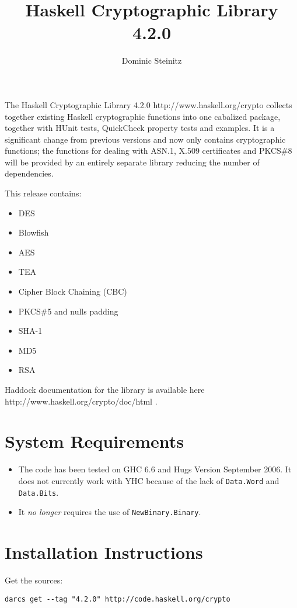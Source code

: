 \documentclass{article}
\title{Haskell Cryptographic Library 4.2.0}
\author{Dominic Steinitz}
\begin{document}
\maketitle

The 
\htmladdnormallinkfoot
{Haskell Cryptographic Library 4.2.0}
{http://www.haskell.org/crypto}
collects together existing Haskell cryptographic
functions into one cabalized package, together with HUnit tests,
QuickCheck property tests and examples. It is a significant
change from previous versions and now only contains cryptographic
functions; the functions for dealing with ASN.1, X.509 certificates
and PKCS\#8 will be provided by an entirely separate library reducing
the number of dependencies.

This release contains:
\begin{itemize}
\item DES
\item Blowfish
\item AES
\item TEA
\item Cipher Block Chaining (CBC)
\item PKCS\#5 and nulls padding
\item SHA-1
\item MD5
\item RSA
\end{itemize}

Haddock documentation for the library is available
\htmladdnormallinkfoot
{here}
{http://www.haskell.org/crypto/doc/html}
.

\section{System Requirements}

\begin{itemize}
\item
The code has been tested on GHC 6.6 and Hugs Version September 2006.
It does not currently work with YHC because of the lack of {\tt Data.Word}
and {\tt Data.Bits}.
\item
It {\em no longer} requires the use of
{\tt NewBinary.Binary}.
\end{itemize}

\section{Installation Instructions}

Get the sources:

\lstset{language=shell,basicstyle=\ttfamily\small}
\begin{lstlisting}[frame=single]
darcs get --tag "4.2.0" http://code.haskell.org/crypto
\end{lstlisting}
\end{document}
